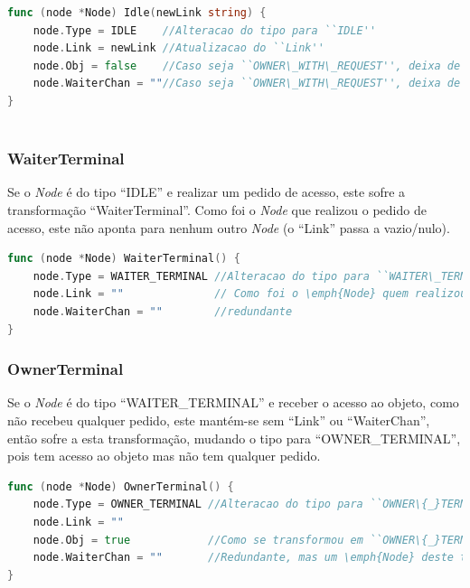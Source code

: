 \begin{lstlisting}[caption={Método/transformação ``Idle''},language=Go]
func (node *Node) Idle(newLink string) {
	node.Type = IDLE    //Alteracao do tipo para ``IDLE''
	node.Link = newLink //Atualizacao do ``Link''
	node.Obj = false    //Caso seja ``OWNER\_WITH\_REQUEST'', deixa de ter acesso ao obj
	node.WaiterChan = ""//Caso seja ``OWNER\_WITH\_REQUEST'', deixa de ter o ``Node'' em espera
}
	
\end{lstlisting}


\subsubsection*{WaiterTerminal}

Se o \emph{Node} é do tipo ``IDLE'' e realizar um pedido de acesso,
este sofre a transformação ``WaiterTerminal''.
Como foi o \emph{Node} que realizou o pedido de acesso, este não aponta para nenhum outro \emph{Node} (o ``Link'' passa a vazio/nulo).


\begin{lstlisting}[caption={Método/transformação ``WaiterTerminal''},language=Go]
func (node *Node) WaiterTerminal() {
	node.Type = WAITER_TERMINAL //Alteracao do tipo para ``WAITER\_TERMINAL''
	node.Link = ""       		// Como foi o \emph{Node} quem realizou o pedido, este nao aponta para nenhum outro \emph{Node}
	node.WaiterChan = "" 		//redundante
}
\end{lstlisting}



\subsubsection*{OwnerTerminal}

Se o \emph{Node} é do tipo ``WAITER\_TERMINAL'' e receber o acesso ao objeto, como
não recebeu qualquer pedido, este mantém-se sem ``Link'' ou ``WaiterChan'', 
então sofre a esta transformação, mudando o tipo para ``OWNER\_TERMINAL'', pois tem acesso ao objeto mas não tem qualquer pedido.

\begin{lstlisting}[caption={Método/transformação ``OwnerTerminal''},language=Go]
func (node *Node) OwnerTerminal() {
	node.Type = OWNER_TERMINAL //Alteracao do tipo para ``OWNER\{_}TERMINAL''
	node.Link = ""             
	node.Obj = true			   //Como se transformou em ``OWNER\{_}TERMINAL'' significa que passou a deter o acesso ao objeto
	node.WaiterChan = ""       //Redundante, mas um \emph{Node} deste tipo nao tem \emph{Node} a espera do acesso ao objeto
}
\end{lstlisting}

